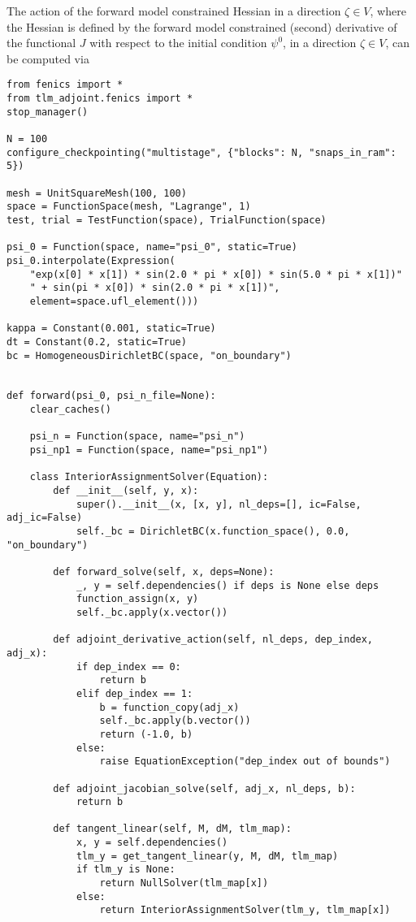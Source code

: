 \documentclass[11pt]{article}
\begin{document}
The action of the forward model constrained Hessian in a direction $\zeta \in
V$, where the Hessian is defined by the forward model constrained (second)
derivative of the functional $J$ with respect to the initial condition
$\psi^0$, in a direction $\zeta \in V$, can be computed via
\begin{lstlisting}
from fenics import *
from tlm_adjoint.fenics import *
stop_manager()

N = 100
configure_checkpointing("multistage", {"blocks": N, "snaps_in_ram": 5})

mesh = UnitSquareMesh(100, 100)
space = FunctionSpace(mesh, "Lagrange", 1)
test, trial = TestFunction(space), TrialFunction(space)

psi_0 = Function(space, name="psi_0", static=True)
psi_0.interpolate(Expression(
    "exp(x[0] * x[1]) * sin(2.0 * pi * x[0]) * sin(5.0 * pi * x[1])"
    " + sin(pi * x[0]) * sin(2.0 * pi * x[1])",
    element=space.ufl_element()))

kappa = Constant(0.001, static=True)
dt = Constant(0.2, static=True)
bc = HomogeneousDirichletBC(space, "on_boundary")


def forward(psi_0, psi_n_file=None):
    clear_caches()

    psi_n = Function(space, name="psi_n")
    psi_np1 = Function(space, name="psi_np1")

    class InteriorAssignmentSolver(Equation):
        def __init__(self, y, x):
            super().__init__(x, [x, y], nl_deps=[], ic=False, adj_ic=False)
            self._bc = DirichletBC(x.function_space(), 0.0, "on_boundary")

        def forward_solve(self, x, deps=None):
            _, y = self.dependencies() if deps is None else deps
            function_assign(x, y)
            self._bc.apply(x.vector())

        def adjoint_derivative_action(self, nl_deps, dep_index, adj_x):
            if dep_index == 0:
                return b
            elif dep_index == 1:
                b = function_copy(adj_x)
                self._bc.apply(b.vector())
                return (-1.0, b)
            else:
                raise EquationException("dep_index out of bounds")

        def adjoint_jacobian_solve(self, adj_x, nl_deps, b):
            return b

        def tangent_linear(self, M, dM, tlm_map):
            x, y = self.dependencies()
            tlm_y = get_tangent_linear(y, M, dM, tlm_map)
            if tlm_y is None:
                return NullSolver(tlm_map[x])
            else:
                return InteriorAssignmentSolver(tlm_y, tlm_map[x])


\end{lstlisting}
\end{document}
